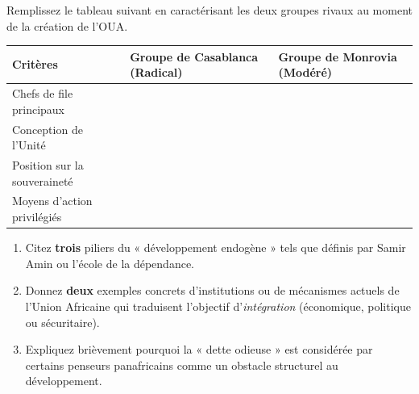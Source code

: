 \documentclass[11pt]{article}
\begin{document}
\begin{exercice}
Remplissez le tableau suivant en caractérisant les deux groupes rivaux au moment de la création de l'OUA.

\begin{tabular}{|l|p{5.5cm}|p{5.5cm}|}
\hline
\textbf{Critères} & \textbf{Groupe de Casablanca (Radical)} & \textbf{Groupe de Monrovia (Modéré)} \\
\hline
Chefs de file principaux & & \\
\hline
Conception de l'Unité & & \\
\hline
Position sur la souveraineté & & \\
\hline
Moyens d'action privilégiés & & \\
\hline
\end{tabular}
\end{exercice}

\begin{exercice}
\begin{enumerate}
    \item Citez \textbf{trois} piliers du « développement endogène » tels que définis par Samir Amin ou l'école de la dépendance.
    \item Donnez \textbf{deux} exemples concrets d'institutions ou de mécanismes actuels de l'Union Africaine qui traduisent l'objectif d'\textit{intégration} (économique, politique ou sécuritaire).
    \item Expliquez brièvement pourquoi la « dette odieuse » est considérée par certains penseurs panafricains comme un obstacle structurel au développement.
\end{enumerate}
\end{exercice}
\end{document}
